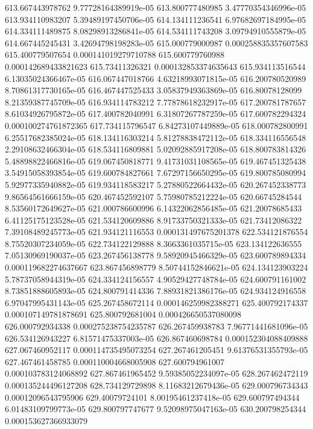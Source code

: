 {613.667443978762 9.77728164389919e-05
613.800777480985 3.47770354346996e-05
613.934110983207 5.39489197450706e-05
614.134111236541 6.97682697184995e-05
614.334111489875 8.08298913286841e-05
614.534111743208 3.09794910555879e-05
614.667445245431 3.42694798198283e-05
615.000779000987 0.000258835357607583
615.400779507654 0.000141019279710788
615.600779760988 0.000142689433821623
615.73411326321 0.000132853374635643
615.934113516544 6.13035024366467e-05
616.067447018766 4.63218993071815e-05
616.200780520989 8.70861317730165e-05
616.467447525433 3.05837949363869e-05
616.80078128099 8.21359387745709e-05
616.934114783212 7.77878618232917e-05
617.200781787657 8.61034926795872e-05
617.400782040991 6.31807267787259e-05
617.600782294324 0.000100274761872365
617.734115796547 6.84273107449889e-05
618.000782800991 6.25517682385024e-05
618.134116303214 5.81278838472112e-05
618.334116556548 2.29108632466304e-05
618.534116809881 5.02092885917208e-05
618.800783814326 5.48898822466816e-05
619.067450818771 9.41731031108565e-05
619.467451325438 3.54915058393854e-05
619.600784827661 7.67297156650295e-05
619.800785080994 5.92977335940882e-05
619.934118583217 5.27880522664432e-05
620.267452338773 9.86564561666159e-05
620.467452592107 5.75980785212224e-05
620.66745284544 8.53560172649627e-05
621.000786600996 6.14322062856485e-05
621.20078685433 6.41125175123528e-05
621.534120609886 8.91733750321333e-05
621.73412086322 7.39108489245773e-05
621.934121116553 0.000131497675201378
622.534121876554 8.75520307234059e-05
622.734122129888 8.3663361035715e-05
623.134122636555 7.05130969190037e-05
623.267456138778 9.58920945466329e-05
623.600789894334 0.000119682274637667
623.867456898779 8.50744152846621e-05
624.134123903224 5.78737058944319e-05
624.334124156557 4.90529427748784e-05
624.600791161002 8.73851888605893e-05
624.800791414336 7.88931821386176e-05
624.934124916558 6.97047995431143e-05
625.267458672114 0.000146259982388271
625.400792174337 0.000107149781878691
625.800792681004 0.000426650537080098
626.000792934338 0.000275238754235787
626.267459938783 7.96771441681096e-05
626.534126943227 6.81571475337003e-05
626.867460698784 0.000152304088409888
627.067460952117 0.000114735495073254
627.267461205451 9.61376531355793e-05
627.467461458785 0.000110004668005908
627.600794961007 0.000103783124068892
627.867461965452 9.59385052234097e-05
628.267462472119 0.000135244496127208
628.734129729898 8.11683212679436e-05
629.000796734343 0.00012096543795906
629.40079724101 8.00195461237418e-05
629.600797494344 6.01483109799773e-05
629.800797747677 9.52098975047163e-05
630.200798254344 0.000153627366933079
}
